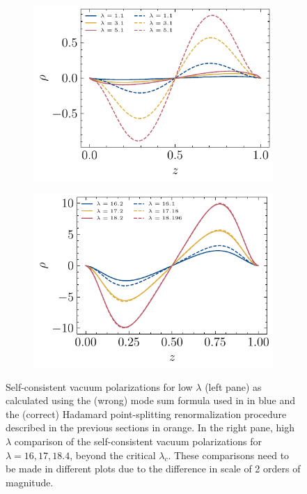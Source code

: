 \begin{figure}
\begin{subfigure}{0.5\textwidth}
    \centering
    \includegraphics[width=\linewidth]{figures/dirichlet/lowLambdaVacuumPolarizationComparison.pdf}
\end{subfigure}
\begin{subfigure}{0.5\textwidth}
    \centering
    \includegraphics[width=\linewidth]{figures/dirichlet/vacuumPolarizationEvolutionComparison.pdf} 
 \end{subfigure}
 \caption{Self-consistent vacuum polarizations for low $\lambda$ (left pane) as calculated using the (wrong) mode sum formula used in \cite{Ambj1983} in blue and the (correct) Hadamard point-splitting renormalization procedure described in the previous sections in orange. In the right pane, high $\lambda$ comparison of the self-consistent vacuum polarizations for $\lambda = 16, 17, 18.4$, beyond the critical $\lambda_c$. These comparisons need to be made in different plots due to the difference in scale of 2 orders of magnitude.}
    \label{fig:lowLambdaVacuumPolarization}
\end{figure}

